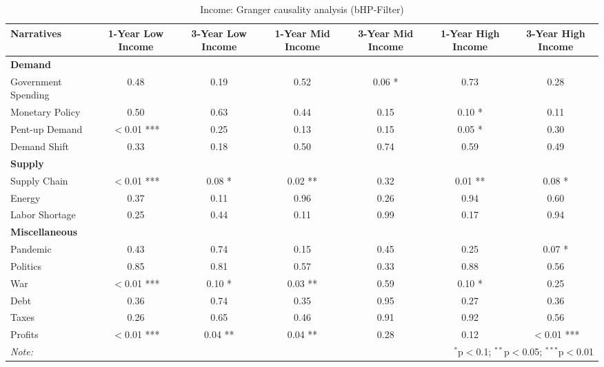 \begin{sidewaystable}[ht]
\centering
\caption{Income: Granger causality analysis (bHP-Filter)}\label{table:granger}

\begin{tabular}{lcccccc}
 \toprule
\textbf{Narratives} & \textbf{1-Year Low Income} & \textbf{3-Year Low Income} & \textbf{1-Year Mid Income} & \textbf{3-Year Mid Income} & \textbf{1-Year High Income} & \textbf{3-Year High Income} \\
\midrule
\multicolumn{7}{l}{\textbf{Demand}} \\
\midrule
Government Spending & 0.48 & 0.19 & 0.52 & 0.06 * & 0.73 & 0.28 \\
Monetary Policy & 0.50 & 0.63 & 0.44 & 0.15 & 0.10 * & 0.11 \\
Pent-up Demand & $<$0.01 *** & 0.25 & 0.13 & 0.15 & 0.05 * & 0.30 \\
Demand Shift & 0.33 & 0.18 & 0.50 & 0.74 & 0.59 & 0.49 \\
\midrule
\multicolumn{7}{l}{\textbf{Supply}} \\
\midrule
Supply Chain & $<$0.01 *** & 0.08 * & 0.02 ** & 0.32 & 0.01 ** & 0.08 * \\
Energy & 0.37 & 0.11 & 0.96 & 0.26 & 0.94 & 0.60 \\
Labor Shortage & 0.25 & 0.44 & 0.11 & 0.99 & 0.17 & 0.94 \\
\midrule
\multicolumn{7}{l}{\textbf{Miscellaneous}} \\
\midrule
Pandemic & 0.43 & 0.74 & 0.15 & 0.45 & 0.25 & 0.07 * \\
Politics & 0.85 & 0.81 & 0.57 & 0.33 & 0.88 & 0.56 \\
War & $<$0.01 *** & 0.10 * & 0.03 ** & 0.59 & 0.10 * & 0.25 \\
Debt & 0.36 & 0.74 & 0.35 & 0.95 & 0.27 & 0.36 \\
Taxes & 0.26 & 0.65 & 0.46 & 0.91 & 0.92 & 0.56 \\
Profits & $<$0.01 *** & 0.04 ** & 0.04 ** & 0.28 & 0.12 & $<$0.01 *** \\
\midrule
\bottomrule
\textit{Note:}  & \multicolumn{6}{r}{$^{*}$p$<$0.1; $^{**}$p$<$0.05; $^{***}$p$<$0.01} \\
\bottomrule
\end{tabular}
\end{sidewaystable}
